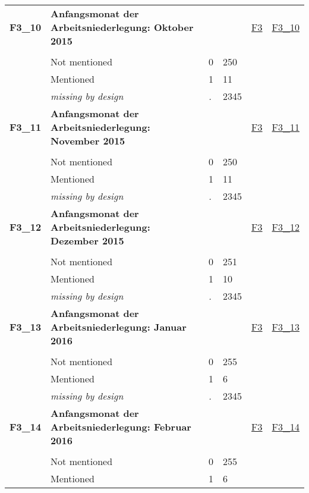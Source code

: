 \begin{longtable}{| L{2.45cm} | L{6cm} | C{1.5cm} | R{1cm} | C{2.25cm} | C{2.25cm} |}
   \midrule
\textbf{F3\_10}\label{var:F3:10} & \textbf{Anfangsmonat der Arbeitsniederlegung: Oktober 2015} &  &  & \hyperref[F3]{F3} & \hyperref[var:suf:F3:10]{F3\_10} \\ 
   &  &  &  &  &  \\ 
   & Not mentioned & 0 & 250 &  &  \\ 
   & Mentioned & 1 & 11 &  &  \\ 
   & \textit{missing by design} & \textit{.} & 2345 &  &  \\ 
   \midrule
\textbf{F3\_11}\label{var:F3:11} & \textbf{Anfangsmonat der Arbeitsniederlegung: November 2015} &  &  & \hyperref[F3]{F3} & \hyperref[var:suf:F3:11]{F3\_11} \\ 
   &  &  &  &  &  \\ 
   & Not mentioned & 0 & 250 &  &  \\ 
   & Mentioned & 1 & 11 &  &  \\ 
   & \textit{missing by design} & \textit{.} & 2345 &  &  \\ 
   \midrule
\textbf{F3\_12}\label{var:F3:12} & \textbf{Anfangsmonat der Arbeitsniederlegung: Dezember 2015} &  &  & \hyperref[F3]{F3} & \hyperref[var:suf:F3:12]{F3\_12} \\ 
   &  &  &  &  &  \\ 
   & Not mentioned & 0 & 251 &  &  \\ 
   & Mentioned & 1 & 10 &  &  \\ 
   & \textit{missing by design} & \textit{.} & 2345 &  &  \\ 
   \midrule
\textbf{F3\_13}\label{var:F3:13} & \textbf{Anfangsmonat der Arbeitsniederlegung: Januar 2016} &  &  & \hyperref[F3]{F3} & \hyperref[var:suf:F3:13]{F3\_13} \\ 
   &  &  &  &  &  \\ 
   & Not mentioned & 0 & 255 &  &  \\ 
   & Mentioned & 1 & 6 &  &  \\ 
   & \textit{missing by design} & \textit{.} & 2345 &  &  \\ 
   \midrule
\textbf{F3\_14}\label{var:F3:14} & \textbf{Anfangsmonat der Arbeitsniederlegung: Februar 2016} &  &  & \hyperref[F3]{F3} & \hyperref[var:suf:F3:14]{F3\_14} \\ 
   &  &  &  &  &  \\ 
   & Not mentioned & 0 & 255 &  &  \\ 
   & Mentioned & 1 & 6 &  &  \\ 

\end{longtable}
